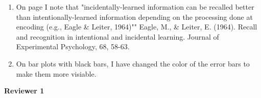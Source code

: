 \documentclass[12pt]{article}
\begin{document}
\begin{enumerate}
\item
	On page \pageref{TODO-13} I note that "incidentally-learned information can be recalled better than intentionally-learned information depending on the processing done at encoding (e.g., Eagle \& Leiter, 1964)""
	Eagle, M., \& Leiter, E. (1964). Recall and recognition in intentional and incidental learning. Journal of Experimental Psychology, 68, 58-63.

\item
	\pageref{TODO-14} On bar plots with black bars, I have changed the color of the error bars to make them more visiable. 


\end{enumerate}


\vspace{20pt}

\textbf{\large{Reviewer 1}}
\end{document}
